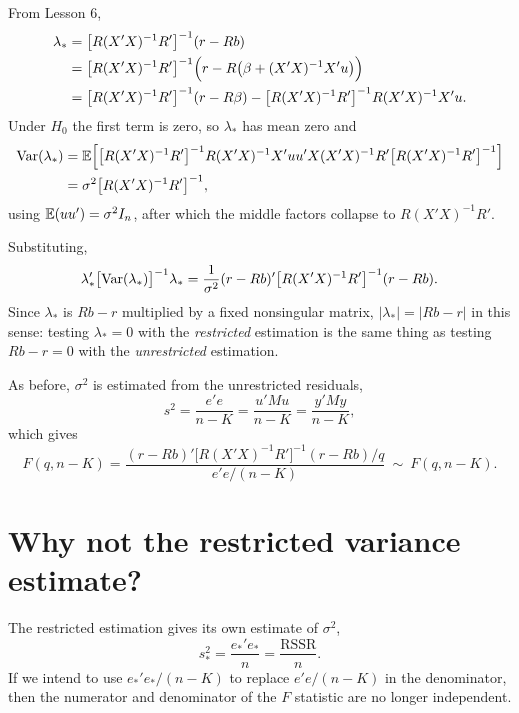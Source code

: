 \documentclass[11pt]{article}
\begin{document}
From Lesson 6,
\begin{align*}
  \lambda_{*} &= \bigl[R(X'X)^{-1}R'\bigr]^{-1}(r - Rb)\\
              &= \bigl[R(X'X)^{-1}R'\bigr]^{-1}\Bigl(r - R\bigl(\beta + (X'X)^{-1}X'u\bigr)\Bigr)\\
              &= \bigl[R(X'X)^{-1}R'\bigr]^{-1}(r - R\beta)
                 - \bigl[R(X'X)^{-1}R'\bigr]^{-1}R(X'X)^{-1}X'u .
\end{align*}
Under $H_{0}$ the first term is zero, so $\lambda_{*}$ has mean zero and
\begin{align*}
  \operatorname{Var}(\lambda_{*})
   &= \mathbb{E}\Bigl[\bigl[R(X'X)^{-1}R'\bigr]^{-1}R(X'X)^{-1}X'uu'X(X'X)^{-1}R'
      \bigl[R(X'X)^{-1}R'\bigr]^{-1}\Bigr]\\
   &= \sigma^{2}\bigl[R(X'X)^{-1}R'\bigr]^{-1},
\end{align*}
using $\mathbb{E}(uu') = \sigma^{2}I_{n}$, after which the middle factors collapse to
$R(X'X)^{-1}R'$.

Substituting,
\[ \lambda_{*}'\bigl[\operatorname{Var}(\lambda_{*})\bigr]^{-1}\lambda_{*}
   = \frac{1}{\sigma^{2}}(r - Rb)'\bigl[R(X'X)^{-1}R'\bigr]^{-1}(r - Rb). \]
Since $\lambda_{*}$ is $Rb - r$ multiplied by a fixed nonsingular matrix,
$|\lambda_{*}| = |Rb - r|$ in this sense: testing $\lambda_{*} = 0$ with the
\emph{restricted} estimation is the same thing as testing $Rb - r = 0$ with the
\emph{unrestricted} estimation.

As before, $\sigma^{2}$ is estimated from the unrestricted residuals,
\[ s^{2} = \frac{e'e}{n - K} = \frac{u'Mu}{n - K} = \frac{y'My}{n - K}, \]
which gives
\[ F(q, n - K)
   = \frac{(r - Rb)'\bigl[R(X'X)^{-1}R'\bigr]^{-1}(r - Rb)/q}{e'e/(n - K)}
   \ \sim\ F(q, n - K). \]


\section{Why not the restricted variance estimate?}

The restricted estimation gives its own estimate of $\sigma^{2}$,
\[ s_{*}^{2} = \frac{e_{*}'e_{*}}{n} = \frac{\text{RSSR}}{n}. \]
If we intend to use $e_{*}'e_{*}/(n - K)$ to replace $e'e/(n-K)$ in the
denominator, then the numerator and denominator of the $F$ statistic are no longer
independent.
\end{document}
